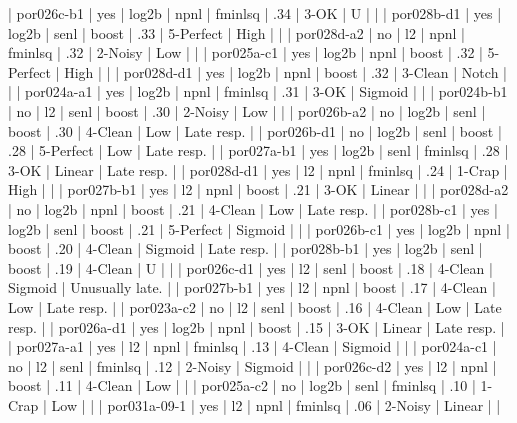      | por026c-b1   | yes   | log2b | npnl | fminlsq     | .34 | 3-OK      | U          |                 |
     | por028b-d1   | yes   | log2b | senl | boost       | .33 | 5-Perfect | High       |                 |
     | por028d-a2   | no    | l2    | npnl | fminlsq     | .32 | 2-Noisy   | Low        |                 |
     | por025a-c1   | yes   | log2b | npnl | boost       | .32 | 5-Perfect | High       |                 |
     | por028d-d1   | yes   | log2b | npnl | boost       | .32 | 3-Clean   | Notch      |                 |
     | por024a-a1   | yes   | log2b | npnl | fminlsq     | .31 | 3-OK      | Sigmoid    |                 |
     | por024b-b1   | no    | l2    | senl | boost       | .30 | 2-Noisy   | Low        |                 |
     | por026b-a2   | no    | log2b | senl | boost       | .30 | 4-Clean   | Low        | Late resp.      |
     | por026b-d1   | no    | log2b | senl | boost       | .28 | 5-Perfect | Low        | Late resp.      |
     | por027a-b1   | yes   | log2b | senl | fminlsq     | .28 | 3-OK      | Linear     | Late resp.      |
     | por028d-d1   | yes   | l2    | npnl | fminlsq     | .24 | 1-Crap    | High       |                 |
     | por027b-b1   | yes   | l2    | npnl | boost       | .21 | 3-OK      | Linear     |                 |
     | por028d-a2   | no    | log2b | npnl | boost       | .21 | 4-Clean   | Low        | Late resp.      |
     | por028b-c1   | yes   | log2b | senl | boost       | .21 | 5-Perfect | Sigmoid    |                 |
     | por026b-c1   | yes   | log2b | npnl | boost       | .20 | 4-Clean   | Sigmoid    | Late resp.      |
     | por028b-b1   | yes   | log2b | senl | boost       | .19 | 4-Clean   | U          |                 |
     | por026c-d1   | yes   | l2    | senl | boost       | .18 | 4-Clean   | Sigmoid    | Unusually late. |
     | por027b-b1   | yes   | l2    | npnl | boost       | .17 | 4-Clean   | Low        | Late resp.      |
     | por023a-c2   | no    | l2    | senl | boost       | .16 | 4-Clean   | Low        | Late resp.      |
     | por026a-d1   | yes   | log2b | npnl | boost       | .15 | 3-OK      | Linear     | Late resp.      |
     | por027a-a1   | yes   | l2    | npnl | fminlsq     | .13 | 4-Clean   | Sigmoid    |                 |
     | por024a-c1   | no    | l2    | senl | fminlsq     | .12 | 2-Noisy   | Sigmoid    |                 |
     | por026c-d2   | yes   | l2    | npnl | boost       | .11 | 4-Clean   | Low        |                 |
     | por025a-c2   | no    | log2b | senl | fminlsq     | .10 | 1-Crap    | Low        |                 |
     | por031a-09-1 | yes   | l2    | npnl | fminlsq     | .06 | 2-Noisy   | Linear     |                 |

